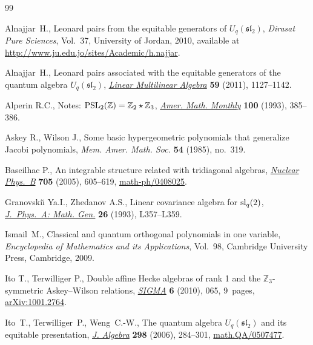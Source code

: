 \documentclass[pdftex]{sigma}
\numberwithin{equation}{section}
\begin{document}
\begin{thebibliography}{99}

\footnotesize\itemsep=0pt

Alnajjar~H.,
Leonard pairs from the equitable generators of $U_q(\mathfrak{sl}_2)$,
{\em Dirasat Pure Sciences}, Vol.~37, University of Jordan, 2010,
available at \url{http://www.ju.edu.jo/sites/Academic/h.najjar}.


Alnajjar~H.,
Leonard pairs associated with the equitable generators of the quantum algebra $U_q(\mathfrak{sl}_2)$,
\href{http://dx.doi.org/10.1080/03081087.2011.565757}{{\em Linear Multilinear Algebra}} {\bf 59} (2011), 1127--1142.



Alperin R.C.,
Notes: ${\rm  {PSL}}_2(\mathbb Z)= \mathbb Z_2 \star \mathbb Z_3$,
\href{http://dx.doi.org/10.2307/2324963}{{\it Amer. Math. Monthly}} {\bf 100} (1993), 385--386.

Askey R., Wilson J.,
Some basic hypergeometric polynomials that generalize Jacobi polynomials,
{\it Mem. Amer. Math. Soc.}  {\bf 54} (1985), no.~319.

Baseilhac P.,
An integrable structure related with tridiagonal algebras,
\href{http://dx.doi.org/10.1016/j.nuclphysb.2004.11.014}{{\it Nuclear Phys.~B}} {\bf 705} (2005), 605--619,
\href{http://arxiv.org/abs/math-ph/0408025}{math-ph/0408025}.



Granovski{\u\i} Ya.I., Zhedanov A.S.,
Linear covariance algebra for ${\rm {s}{l}}\sb q(2)$,
\href{http://dx.doi.org/10.1088/0305-4470/26/7/001}{{\it J.~Phys.~A: Math. Gen.}} {\bf 26} (1993), L357--L359.


Ismail~M.,
Classical and quantum orthogonal polynomials in one variable,
{\it Encyclopedia of Mathematics and its Applications}, Vol.~98, Cambridge University Press, Cambridge, 2009.

Ito T., Terwilliger P.,
Double af\/f\/ine Hecke algebras of rank 1 and the $\mathbb Z_3$-symmetric Askey--Wilson relations,
\href{http://dx.doi.org/10.3842/SIGMA.2010.065}{{\it SIGMA}} {\bf 6} (2010),  065, 9~pages,
\href{http://arxiv.org/abs/1001.2764}{arXiv:1001.2764}.

Ito~T., Terwilliger~P., Weng~C.-W.,
The quantum algebra $U_q(\mathfrak{sl}_2)$ and its equitable presentation,
\href{http://dx.doi.org/10.1016/j.jalgebra.2005.07.038}{{\em J. Algebra}}  {\bf 298}  (2006), 284--301,
\href{http://arxiv.org/abs/math.QA/0507477}{math.QA/0507477}.



\end{thebibliography}
\end{document}
